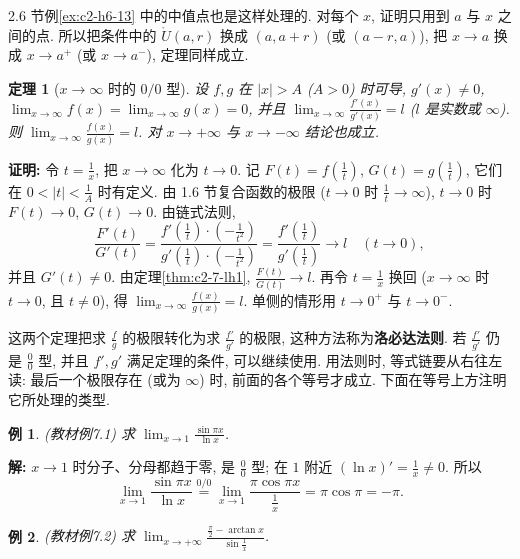 \documentclass[UTF8,openany]{ctexbook}
\theoremstyle{chinesetextbook}
\newtheorem{example}{例}[section]
\newtheorem{theorem}{定理}[section]
\newenvironment{cnproof}{\par\indent\textbf{证明:} \ignorespaces}{\par}
\newenvironment{cnsolution}{\par\indent\textbf{解:} \ignorespaces}{\par}
\begin{document}
2.6 节例\ref{ex:c2-h6-13} 中的中值点也是这样处理的. 对每个 $x$, 证明只用到 $a$ 与 $x$ 之间的点. 所以把条件中的 $\mathring U(a,r)$ 换成 $(a,a+r)$ (或 $(a-r,a)$), 把 $x\to a$ 换成 $x\to a^+$ (或 $x\to a^-$), 定理同样成立.
\begin{theorem}[$x\to\infty$ 时的 $0/0$ 型]\label{thm:c2-7-lh2}
设 $f,g$ 在 $|x|>A$ ($A>0$) 时可导, $g'(x)\ne0$, $\displaystyle\lim_{x\to\infty}f(x)=\lim_{x\to\infty}g(x)=0$, 并且 $\displaystyle\lim_{x\to\infty}\frac{f'(x)}{g'(x)}=l$ ($l$ 是实数或 $\infty$). 则 $\displaystyle\lim_{x\to\infty}\frac{f(x)}{g(x)}=l$. 对 $x\to+\infty$ 与 $x\to-\infty$ 结论也成立.
\end{theorem}
\begin{cnproof}
令 $\displaystyle t=\frac1x$, 把 $x\to\infty$ 化为 $t\to0$. 记 $\displaystyle F(t)=f\left(\frac1t\right)$, $\displaystyle G(t)=g\left(\frac1t\right)$, 它们在 $\displaystyle0<|t|<\frac1A$ 时有定义. 由 1.6 节复合函数的极限 ($t\to0$ 时 $\displaystyle\frac1t\to\infty$), $t\to0$ 时 $F(t)\to0$, $G(t)\to0$. 由链式法则,
\[
\frac{F'(t)}{G'(t)}=\frac{f'\left(\frac1t\right)\cdot\left(-\frac1{t^2}\right)}{g'\left(\frac1t\right)\cdot\left(-\frac1{t^2}\right)}=\frac{f'\left(\frac1t\right)}{g'\left(\frac1t\right)}\to l\quad(t\to0),
\]
并且 $G'(t)\ne0$. 由定理\ref{thm:c2-7-lh1}, $\displaystyle\frac{F(t)}{G(t)}\to l$. 再令 $\displaystyle t=\frac1x$ 换回 ($x\to\infty$ 时 $t\to0$, 且 $t\ne0$), 得 $\displaystyle\lim_{x\to\infty}\frac{f(x)}{g(x)}=l$. 单侧的情形用 $t\to0^+$ 与 $t\to0^-$.
\end{cnproof}
这两个定理把求 $\displaystyle\frac fg$ 的极限转化为求 $\displaystyle\frac{f'}{g'}$ 的极限, 这种方法称为\textbf{洛必达法则}. 若 $\displaystyle\frac{f'}{g'}$ 仍是 $\displaystyle\frac00$ 型, 并且 $f',g'$ 满足定理的条件, 可以继续使用. 用法则时, 等式链要从右往左读: 最后一个极限存在 (或为 $\infty$) 时, 前面的各个等号才成立. 下面在等号上方注明它所处理的类型.
\begin{example}\label{ex:c2-7-1}
\textnormal{(教材例7.1)} 求 $\displaystyle\lim_{x\to1}\frac{\sin\pi x}{\ln x}$.
\end{example}
\begin{cnsolution}
$x\to1$ 时分子、分母都趋于零, 是 $\displaystyle\frac00$ 型; 在 $1$ 附近 $\displaystyle(\ln x)'=\frac1x\ne0$. 所以
\[
\lim_{x\to1}\frac{\sin\pi x}{\ln x}\overset{0/0}{=}\lim_{x\to1}\frac{\pi\cos\pi x}{\frac1x}=\pi\cos\pi=-\pi.
\]
\end{cnsolution}
\begin{example}\label{ex:c2-7-2}
\textnormal{(教材例7.2)} 求 $\displaystyle\lim_{x\to+\infty}\frac{\frac\pi2-\arctan x}{\sin\frac1x}$.
\end{example}
\end{document}
